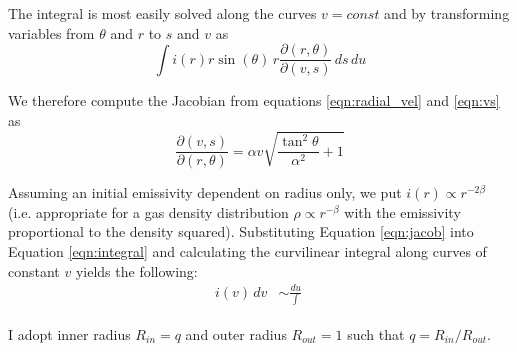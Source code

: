 The integral is most easily solved along the curves $v=const$ and by transforming variables from $\theta$ and $r$ to $s$ and $v$ as
\begin{equation}
\label{eqn:integral}
\int i(r) r \sin (\theta) \, r \frac{\partial (r,\theta)}{\partial (v,s)}\, ds \, du
\end{equation}

We therefore compute the Jacobian from equations \ref{eqn:radial_vel} and \ref{eqn:vs} as
\begin{equation}
\label{eqn:jacob}
\frac{\partial (v,s)}{\partial (r,\theta)} = \alpha v \sqrt{\frac{\tan^2\theta}{\alpha^2}+1}
\end{equation}

Assuming an initial emissivity dependent on radius only, we put $i(r) \propto r^{-2\beta}$ (i.e. appropriate for a gas density distribution $\rho \propto r^{-\beta}$ with the emissivity proportional to the density squared).  Substituting Equation \ref{eqn:jacob} into Equation \ref{eqn:integral} and calculating the curvilinear integral along curves of constant $v$ yields the following:
\begin{align}
i(v) \,d v  &\sim \frac{du} \int_\ 
\end{align}


I adopt inner radius $R_{in}=q$  and outer radius $R_{out}=1$ such that $q=R_{in}/R_{out}$.

